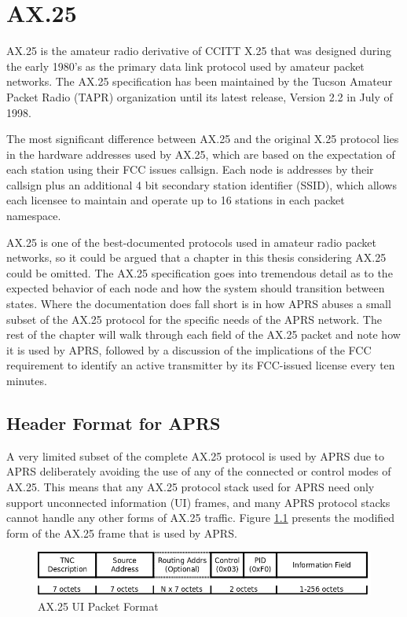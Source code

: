 \chapter{AX.25}

AX.25 is the amateur radio derivative of CCITT X.25 that was designed during the early 1980's 
as the primary data link protocol used by amateur packet networks.
The AX.25 specification has been maintained by the Tucson Amateur Packet Radio (TAPR) 
organization until its latest release, Version 2.2 in July of 1998. 

The most significant difference between AX.25 and the original X.25 protocol lies
in the hardware addresses used by AX.25, which are based on the expectation of
each station using their FCC issues callsign. 
Each node is addresses by their callsign plus an additional 4 bit 
secondary station identifier (SSID), which allows each licensee to maintain and operate 
up to 16 stations in each packet namespace.

AX.25 is one of the best-documented protocols used in amateur radio packet networks,
so it could be argued that a chapter in this thesis considering AX.25 could be omitted.
The AX.25 specification goes into tremendous detail as to the expected behavior of each
node and how the system should transition between states.
Where the documentation does fall short is in how APRS abuses a small subset of 
the AX.25 protocol for the specific needs of the APRS network.
The rest of the chapter will walk through each field of the AX.25 packet and
note how it is used by APRS, followed by a discussion of the implications of the FCC
requirement to identify an active transmitter by its FCC-issued license every ten minutes.

\section{Header Format for APRS}

A very limited subset of the complete AX.25 protocol is used by APRS due to APRS 
deliberately avoiding the use of any of the connected or control modes of AX.25. This 
means that any AX.25 protocol stack used for APRS need only support unconnected information (UI)
frames, and many APRS protocol stacks cannot handle any other forms of AX.25 traffic. 
Figure \ref{fig:ax25uiformat} presents the modified form of the AX.25 frame that is used
by APRS.

\begin{figure}
	\centering
	\includegraphics[width=1.0\textwidth]{src/dia/ax25ui}
	\caption{AX.25 UI Packet Format}
	\label{fig:ax25uiformat}
\end{figure}

